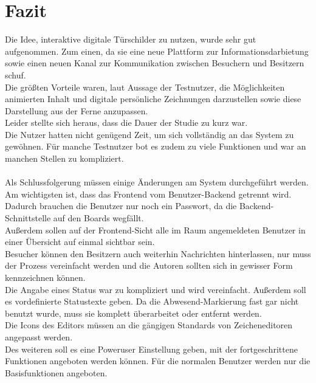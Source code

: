 \chapter{Fazit}\label{Fazit}
Die Idee, interaktive digitale Türschilder zu nutzen, wurde sehr gut aufgenommen.
Zum einen, da sie eine neue Plattform zur Informationsdarbietung sowie einen neuen Kanal zur Kommunikation zwischen Besuchern und Besitzern schuf.
\\
Die größten Vorteile waren, laut Aussage der Testnutzer, die Möglichkeiten animierten Inhalt und digitale persönliche Zeichnungen darzustellen sowie diese Darstellung aus der Ferne anzupassen.
\\
Leider stellte sich heraus, dass die Dauer der Studie zu kurz war.
\\
Die Nutzer hatten nicht genügend Zeit, um sich vollständig an das System zu gewöhnen.
Für manche Testnutzer bot es zudem zu viele Funktionen und war an manchen Stellen zu kompliziert.
\\
\\
Als Schlussfolgerung müssen einige Änderungen am System durchgeführt werden.
Am wichtigsten ist, dass das Frontend vom Benutzer-Backend getrennt wird.
Dadurch brauchen die Benutzer nur noch ein Passwort, da die Backend-Schnittstelle auf den Boards wegfällt.
\\
Außerdem sollen auf der Frontend-Sicht alle im Raum angemeldeten Benutzer in einer Übersicht auf einmal sichtbar sein.
\\
Besucher können den Besitzern auch weiterhin Nachrichten hinterlassen, nur muss der Prozess vereinfacht werden und die Autoren sollten sich in gewisser Form kennzeichnen können.
\\
Die Angabe eines Status war zu kompliziert und wird vereinfacht.
Außerdem soll es vordefinierte Statustexte geben.
Da die Abwesend-Markierung fast gar nicht benutzt wurde, muss sie komplett überarbeitet oder entfernt werden.
\\
Die Icons des Editors müssen an die gängigen Standards von Zeicheneditoren angepasst werden.
\\
Des weiteren soll es eine Poweruser Einstellung geben, mit der fortgeschrittene Funktionen angeboten werden können. Für die normalen Benutzer werden nur die Basisfunktionen angeboten.
